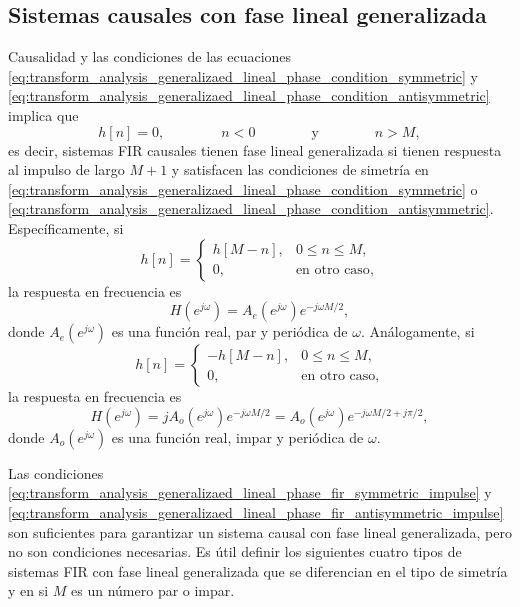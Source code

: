 \documentclass[a4paper]{report}
\begin{document}
\subsection{Sistemas causales con fase lineal generalizada}\label{sec:transform_analysis_generalized_linear_phase_causal}

Causalidad y las condiciones de las ecuaciones \ref{eq:transform_analysis_generalizaed_lineal_phase_condition_symmetric} y \ref{eq:transform_analysis_generalizaed_lineal_phase_condition_antisymmetric} implica que 
\[
 h[n]=0,
 \qquad\qquad 
 n<0
 \qquad\qquad\textrm{y}\qquad\qquad
 n>M,
\]
es decir, sistemas FIR causales tienen fase lineal generalizada si tienen respuesta al impulso de largo \(M+1\) y satisfacen las condiciones de simetría en \ref{eq:transform_analysis_generalizaed_lineal_phase_condition_symmetric} o \ref{eq:transform_analysis_generalizaed_lineal_phase_condition_antisymmetric}. Específicamente, si
\begin{equation}\label{eq:transform_analysis_generalizaed_lineal_phase_fir_symmetric_impulse}
 h[n]=
 \left\{
 \begin{array}{ll}
  h[M-n],&0\leq n\leq M,\\
  0,&\textrm{en otro caso},
 \end{array}
 \right. 
\end{equation}
la respuesta en frecuencia es
\begin{equation}\label{eq:transform_analysis_generalizaed_lineal_phase_fir_symmetric_freq}
 H(e^{j\omega})=A_e(e^{j\omega})e^{-j\omega M/2}, 
\end{equation}
donde \(A_e(e^{j\omega})\) es una función real, par y periódica de \(\omega\). Análogamente, si
\begin{equation}\label{eq:transform_analysis_generalizaed_lineal_phase_fir_antisymmetric_impulse}
 h[n]=
 \left\{
 \begin{array}{ll}
  -h[M-n],&0\leq n\leq M,\\
  0,&\textrm{en otro caso},
 \end{array}
 \right. 
\end{equation}
la respuesta en frecuencia es
\begin{equation}\label{eq:transform_analysis_generalizaed_lineal_phase_fir_antisymmetric_freq}
 H(e^{j\omega})=jA_o(e^{j\omega})e^{-j\omega M/2}=A_o(e^{j\omega})e^{-j\omega M/2+j\pi/2}, 
\end{equation}
donde \(A_o(e^{j\omega})\) es una función real, impar y periódica de \(\omega\).

Las condiciones \ref{eq:transform_analysis_generalizaed_lineal_phase_fir_symmetric_impulse} y \ref{eq:transform_analysis_generalizaed_lineal_phase_fir_antisymmetric_impulse} son suficientes para garantizar un sistema causal con fase lineal generalizada, pero no son condiciones necesarias. Es útil definir los siguientes cuatro tipos de sistemas FIR con fase lineal generalizada que se diferencian en el tipo de simetría y en si \(M\) es un número par o impar.
\end{document}
